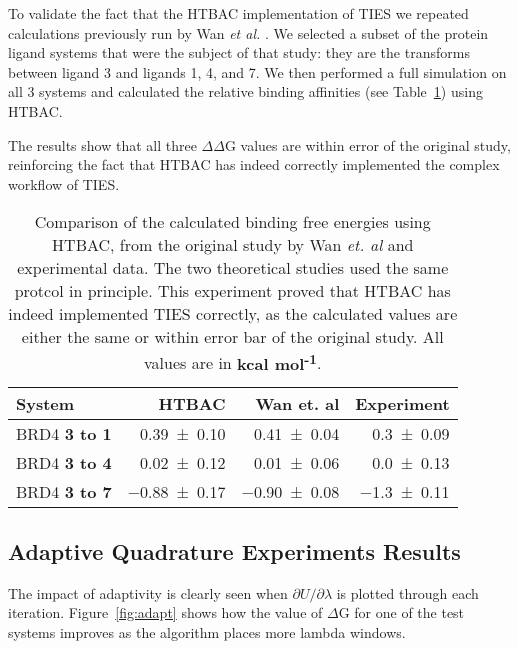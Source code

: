 To validate the fact that the HTBAC implementation of TIES we 
repeated calculations previously run by Wan \textit{et al.}
\cite{Wan2017brd4}. We selected a subset of the protein ligand systems that
were the subject of that study: they are the transforms between ligand 3 and ligands 1, 4,
and 7. We then performed a full simulation on all 3 systems and calculated the
relative binding affinities (see Table~\ref{tab:exp2}) using HTBAC.

The results show that all three $\Delta \Delta$G values are within error 
of the original study, reinforcing the fact that HTBAC has indeed correctly
implemented the complex workflow of TIES.

\begin{table}
  \centering
  \begin{tabular}{l@{\hskip 1in}r@{\hskip 0.2in}r@{\hskip 0.2in}r}
    \toprule
    System & HTBAC & Wan et. al & Experiment \\
    \midrule
    BRD4 \textbf{3 to 1} & \num{0.39 +- 0.10} &   \num{0.41 +- 0.04} &  \num{0.3 +- 0.09} \\
    BRD4 \textbf{3 to 4} & \num{0.02 +- 0.12} &   \num{0.01 +- 0.06} &  \num{0.0 +- 0.13} \\
    BRD4 \textbf{3 to 7} & \num{-0.88 +- 0.17} &  \num{-0.90 +- 0.08} & \num{-1.3 +- 0.11} \\
    \bottomrule
  \end{tabular}

  \caption{Comparison of the calculated binding free energies using HTBAC, from
  the original study by Wan \textit{et. al} and experimental data. The two theoretical
  studies used the same protcol in principle. This experiment proved that HTBAC
  has indeed implemented TIES correctly, as the calculated values are either
  the same or within error bar of the original study. All values are in
  \textbf{kcal mol\textsuperscript{-1}}.}
  \label{tab:exp2}


\end{table}


\subsection{Adaptive Quadrature Experiments Results}

The impact of adaptivity is clearly seen when $\partial U/\partial\lambda$ is plotted through each iteration. 
Figure~\ref{fig:adapt} shows
how the value of $\Delta$G for one of the test systems improves as the
algorithm places more lambda windows. 

